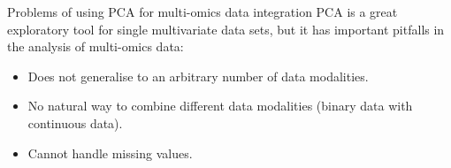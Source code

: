 \documentclass[aspectratio=169,notes]{beamer}
\begin{document}



	\begin{frame}{Problems of using PCA for multi-omics data integration}
	PCA is a great exploratory tool for single multivariate data sets, but it has important pitfalls in the analysis of multi-omics data:
	\begin{itemize}
		\item Does not generalise to an arbitrary number of data modalities.
		\item No natural way to combine different data modalities (binary data with continuous data).
		\item Cannot handle missing values.
	\end{itemize}
	\end{frame}
\end{document}
